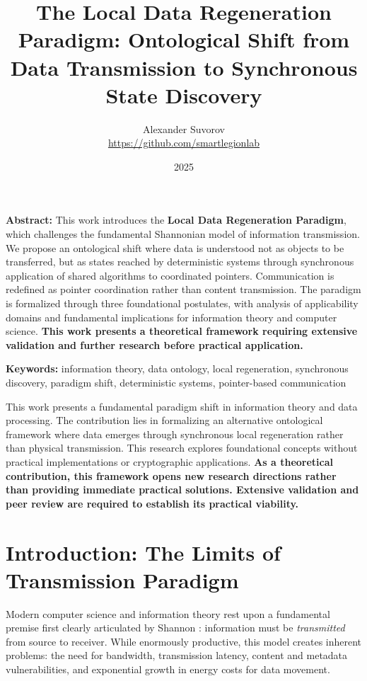 \documentclass[11pt,a4paper]{article}
\title{The Local Data Regeneration Paradigm: Ontological Shift from Data Transmission to Synchronous State Discovery}
\author{Alexander Suvorov \\ \url{https://github.com/smartlegionlab}}
\date{2025}
\begin{document}
\maketitle

\begin{summarybox}
\textbf{Abstract:} This work introduces the \textbf{Local Data Regeneration Paradigm}, which challenges the fundamental Shannonian model of information transmission. We propose an ontological shift where data is understood not as objects to be transferred, but as states reached by deterministic systems through synchronous application of shared algorithms to coordinated pointers. Communication is redefined as pointer coordination rather than content transmission. The paradigm is formalized through three foundational postulates, with analysis of applicability domains and fundamental implications for information theory and computer science. \textbf{This work presents a theoretical framework requiring extensive validation and further research before practical application.}
\end{summarybox}

\textbf{Keywords:} information theory, data ontology, local regeneration, synchronous discovery, paradigm shift, deterministic systems, pointer-based communication

\begin{importantbox}
This work presents a fundamental paradigm shift in information theory and data processing. The contribution lies in formalizing an alternative ontological framework where data emerges through synchronous local regeneration rather than physical transmission. This research explores foundational concepts without practical implementations or cryptographic applications. \textbf{As a theoretical contribution, this framework opens new research directions rather than providing immediate practical solutions. Extensive validation and peer review are required to establish its practical viability.}
\end{importantbox}

\section{Introduction: The Limits of Transmission Paradigm}

Modern computer science and information theory rest upon a fundamental premise first clearly articulated by Shannon \cite{shannon}: information must be \emph{transmitted} from source to receiver. While enormously productive, this model creates inherent problems: the need for bandwidth, transmission latency, content and metadata vulnerabilities, and exponential growth in energy costs for data movement.
\end{document}
